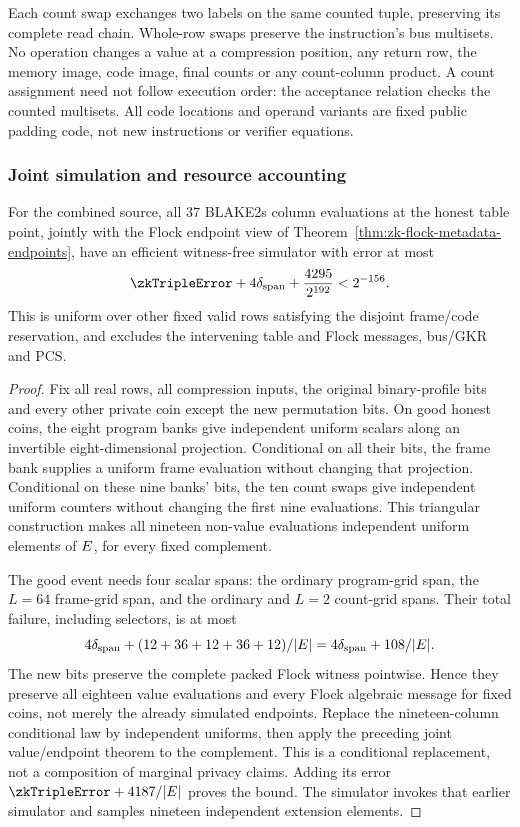 Each count swap exchanges two labels on the same counted tuple, preserving its complete read chain. Whole-row swaps preserve the instruction's bus multisets. No operation changes a value at a compression position, any return row, the memory image, code image, final counts or any count-column product. A count assignment need not follow execution order: the acceptance relation checks the counted multisets. All code locations and operand variants are fixed public padding code, not new instructions or verifier equations.

\subsubsection{Joint simulation and resource accounting}

\begin{theorem}\label{thm:zk-flock-all-columns}
For the combined source, all $37$ BLAKE2s column evaluations at the honest table point, jointly with the Flock endpoint view of Theorem~\ref{thm:zk-flock-metadata-endpoints}, have an efficient witness-free simulator with error at most
\[
 \zkTripleError+4\delta_{\mathrm{span}}+\frac{4295}{2^{192}}<2^{-156}.
\]
This is uniform over other fixed valid rows satisfying the disjoint frame/code reservation, and excludes the intervening table and Flock messages, bus/GKR and PCS.
\end{theorem}
\begin{proof}
Fix all real rows, all compression inputs, the original binary-profile bits and every other private coin except the new permutation bits. On good honest coins, the eight program banks give independent uniform scalars along an invertible eight-dimensional projection. Conditional on all their bits, the frame bank supplies a uniform frame evaluation without changing that projection. Conditional on these nine banks' bits, the ten count swaps give independent uniform counters without changing the first nine evaluations. This triangular construction makes all nineteen non-value evaluations independent uniform elements of $E$, for every fixed complement.

The good event needs four scalar spans: the ordinary program-grid span, the $L=64$ frame-grid span, and the ordinary and $L=2$ count-grid spans. Their total failure, including selectors, is at most
\[
 4\delta_{\mathrm{span}}+(12+36+12+36+12)/|E|
 =4\delta_{\mathrm{span}}+108/|E|.
\]
The new bits preserve the complete packed Flock witness pointwise. Hence they preserve all eighteen value evaluations and every Flock algebraic message for fixed coins, not merely the already simulated endpoints. Replace the nineteen-column conditional law by independent uniforms, then apply the preceding joint value/endpoint theorem to the complement. This is a conditional replacement, not a composition of marginal privacy claims. Adding its error $\zkTripleError+4187/|\E|$ proves the bound. The simulator invokes that earlier simulator and samples nineteen independent extension elements.
\end{proof}

